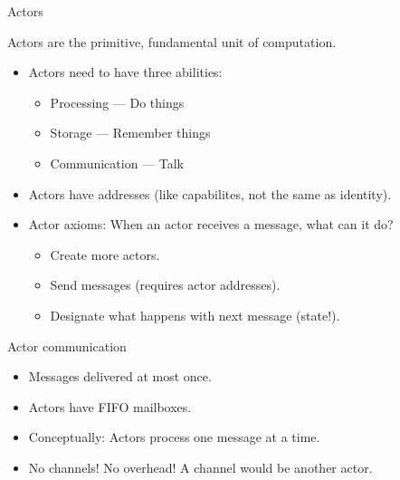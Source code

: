 \documentclass[aspectratio=169,14pt]{beamer}
\begin{document}
\begin{frame}{Actors}

  Actors are the primitive, fundamental unit of computation.

  \begin{itemize}
  \item Actors need to have three abilities:
    \begin{itemize}
    \item Processing --- Do things
    \item Storage --- Remember things
    \item Communication --- Talk
    \end{itemize}

  \item Actors have addresses (like capabilites, not the same as identity).

  \item Actor axioms: When an actor receives a message, what can it do?
    \begin{itemize}
    \item Create more actors.
    \item Send messages (requires actor addresses).
    \item Designate what happens with next message (state!).
    \end{itemize}
  \end{itemize}
\end{frame}

\begin{frame}{Actor communication}
  \begin{figure}
  \end{figure}

  \begin{itemize}
  \item Messages delivered at most once.
  \item Actors have FIFO mailboxes.
  \item Conceptually: Actors process one message at a time.
  \item No channels! No overhead! A channel would be another actor.
  \end{itemize}
\end{frame}
\end{document}
